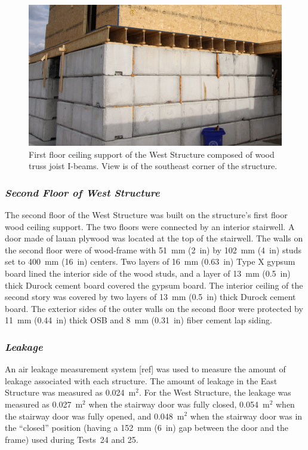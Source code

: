 \begin{figure}[!h]
	\centering
	\includegraphics[width=6in]{Figures/Pictures/TJI_support}
	\caption[Ceiling support of the West Structure]{First floor ceiling support of the West Structure composed of wood truss joist I-beams. View is of the southeast corner of the structure.}
	\label{fig:TJI}
\end{figure}

\subsubsection*{\textit{Second Floor of West Structure}}
The second floor of the West Structure was built on the structure's first floor wood ceiling support. The two floors were connected by an interior stairwell. A door made of lauan plywood was located at the top of the stairwell. The walls on the second floor were of wood-frame with 51~mm (2~in) by 102~mm (4~in) studs set to 400~mm (16~in) centers. Two layers of 16~mm (0.63~in) Type X gypsum board lined the interior side of the wood studs, and a layer of 13~mm (0.5~in) thick Durock cement board covered the gypsum board. The interior ceiling of the second story was covered by two layers of 13~mm (0.5~in) thick Durock cement board. The exterior sides of the outer walls on the second floor were protected by 11~mm (0.44~in) thick OSB and 8~mm (0.31~in) fiber cement lap siding.

\subsubsection*{\textit{Leakage}}

An air leakage measurement system [ref] was used to measure the amount of leakage associated with each structure. The amount of leakage in the East Structure was measured as 0.024~m$^2$. For the West Structure, the leakage was measured as 0.027~m$^2$ when the stairway door was fully closed, 0.054~m$^2$ when the stairway door was fully opened, and 0.048~m$^2$ when the stairway door was in the ``closed'' position (having a 152~mm (6~in) gap between the door and the frame) used during Tests~24 and 25.

